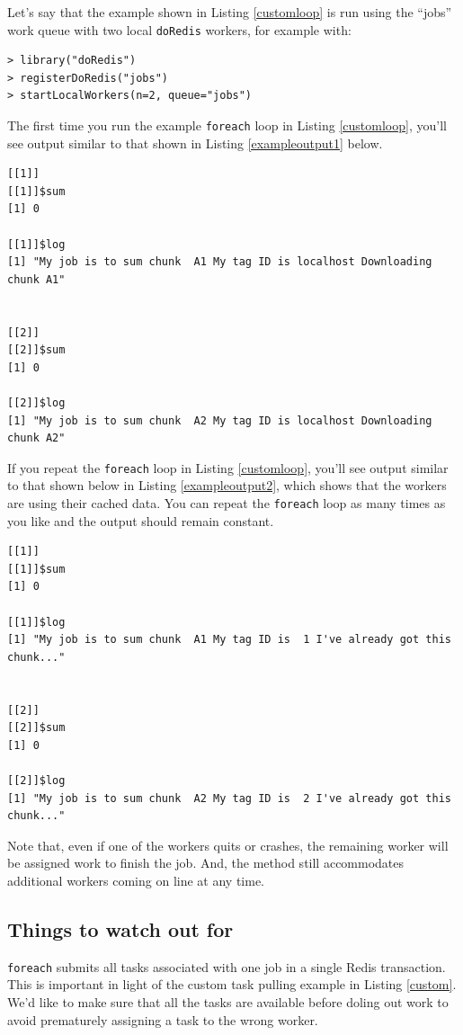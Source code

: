 \documentclass[12pt]{article}
\begin{document}
Let's say that the example shown in Listing \ref{customloop} is run
using the ``jobs'' work queue with two local \verb+doRedis+ workers,
for example with:
\begin{lstlisting}[float=!ht,caption=Starting two local R workers,xleftmargin=0pt]
> library("doRedis")
> registerDoRedis("jobs")
> startLocalWorkers(n=2, queue="jobs")
\end{lstlisting}
The first time you run the example \verb+foreach+ loop in Listing
\ref{customloop}, you'll see output similar to that shown
in Listing \ref{exampleoutput1} below.
\begin{lstlisting}[float=!ht,caption=First foreach loop run,label=exampleoutput1]
[[1]]
[[1]]$sum
[1] 0
  
[[1]]$log
[1] "My job is to sum chunk  A1 My tag ID is localhost Downloading chunk A1"
  
  
[[2]]
[[2]]$sum
[1] 0
  
[[2]]$log
[1] "My job is to sum chunk  A2 My tag ID is localhost Downloading chunk A2"
\end{lstlisting}
If you repeat the \verb+foreach+ loop in Listing \ref{customloop}, you'll see output
similar to that shown below in Listing \ref{exampleoutput2}, which shows that the
workers are using their cached data. You can repeat the \verb+foreach+ loop as many
times as you like and the output should remain constant.
\begin{lstlisting}[float=!ht,caption=Repeated foreach loop runs,label=exampleoutput2]
[[1]]
[[1]]$sum
[1] 0

[[1]]$log
[1] "My job is to sum chunk  A1 My tag ID is  1 I've already got this chunk..."


[[2]]
[[2]]$sum
[1] 0

[[2]]$log
[1] "My job is to sum chunk  A2 My tag ID is  2 I've already got this chunk..."
\end{lstlisting}

Note that, even if one of the workers quits or crashes, the remaining worker
will be assigned work to finish the job. And, the method still accommodates
additional workers coming on line at any time.


\subsection{Things to watch out for}

\verb+foreach+ submits all tasks associated with one job in a single Redis
transaction. This is important in light of the custom task pulling example in
Listing \ref{custom}.  We'd like to make sure that all the tasks are available
before doling out work to avoid prematurely assigning a task to the wrong
worker.
\end{document}
